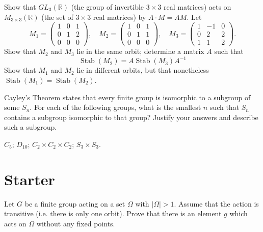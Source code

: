 \documentclass[answers]{exam}
\begin{document}
\begin{questions}
\question%
\begin{subparts}
\subpart Show that $G L_{3}(\mathbb{R})$ (the group of invertible $3 \times 3$ real matrices) acts on $M_{3 \times 3}(\mathbb{R})$ (the set of $3 \times 3$ real matrices) by $A \cdot M=A M$.
\subpart Let \[
	M_{1}=\begin{pmatrix}
		1 & 0 & 1 \\
		0 & 1 & 2 \\
		0 & 0 & 0
	\end{pmatrix}, \quad M_{2}=\begin{pmatrix}
		1 & 0 & 1 \\
		0 & 1 & 1 \\
		0 & 0 & 0
	\end{pmatrix}, \quad M_{3}=\begin{pmatrix}
		1 & -1 & 0 \\
		0 & 2 & 2 \\
		1 & 1 & 2
	\end{pmatrix}.
\] Show that $M_{2}$ and $M_{3}$ lie in the same orbit; determine a matrix $A$ such that \[
	\operatorname{Stab}\left(M_{2}\right)=A \operatorname{Stab}\left(M_{3}\right) A^{-1}
\]
\subpart Show that $M_{1}$ and $M_{2}$ lie in different orbits, but that nonetheless $\operatorname{Stab}\left(M_{1}\right)=\operatorname{Stab}\left(M_{2}\right)$.
\end{subparts}



\question%
Cayley's Theorem states that every finite group is isomorphic to a subgroup of some $S_{n}$. For each of the following groups, what is the smallest $n$ such that $S_{n}$ contains a subgroup isomorphic to that group? Justify your answers and describe such a subgroup.
\begin{subparts}
\subpart $C_{5}$;
\subpart $D_{10}$;
\subpart $C_{2} \times C_{2} \times C_{2}$;
\subpart $S_{3} \times S_{3}$.
\end{subparts}

\end{questions}

\section*{Starter}
\begin{questions}
\question%
Let $G$ be a finite group acting on a set $\Omega$ with $|\Omega|>1$. Assume that the action is transitive (i.e. there is only one orbit). Prove that there is an element $g$ which acts on $\Omega$ without any fixed points.

\end{questions}
\end{document}
